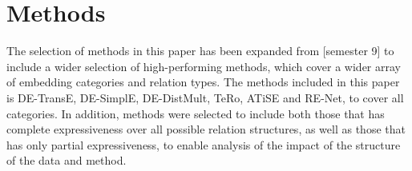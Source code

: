 \section{Methods}
\label{sec:methods}

The selection of methods in this paper has been expanded from [semester 9] to include a wider selection of high-performing methods, which cover a wider array of embedding categories and relation types. The methods included in this paper is DE-TransE, DE-SimplE, DE-DistMult, TeRo, ATiSE and RE-Net, to cover all categories. In addition, methods were selected to include both those that has complete expressiveness over all possible relation structures, as well as those that has only partial expressiveness, to enable analysis of the impact of the structure of the data and method.

